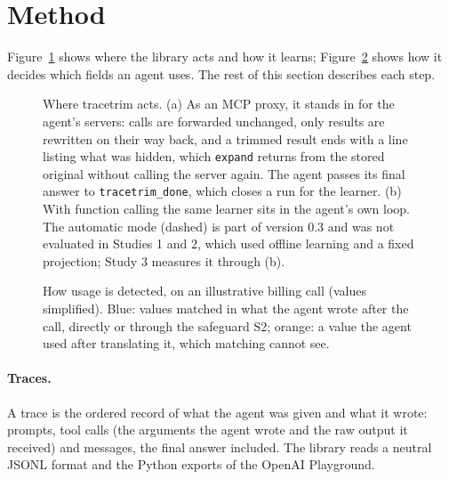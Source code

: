 \section{Method}
\label{sec:method}

Figure~\ref{fig:architecture} shows where the library acts and how it learns; Figure~\ref{fig:usage} shows how
it decides which fields an agent uses. The rest of this section describes each step.

\begin{figure}[t]
\centering

\caption{Where tracetrim acts. (a) As an MCP proxy, it stands in for the agent's servers: calls are forwarded
unchanged, only results are rewritten on their way back, and a trimmed result ends with a line listing what was
hidden, which \texttt{expand} returns from the stored original without calling the server again. The agent passes
its final answer to \texttt{tracetrim\_done}, which closes a run for the learner. (b) With function calling the same
learner sits in the agent's own loop. The automatic mode (dashed) is part of version 0.3 and was not evaluated in
Studies 1 and 2, which used offline learning and a fixed projection; Study 3 measures it through (b).}
\label{fig:architecture}
\end{figure}

\begin{figure}[t]
\centering

\caption{How usage is detected, on an illustrative billing call (values simplified). Blue: values matched in what
the agent wrote after the call, directly or through the safeguard S2; orange: a value the agent used after
translating it, which matching cannot see.}
\label{fig:usage}
\end{figure}

\paragraph{Traces.} A trace is the ordered record of what the agent was given and what it wrote: prompts, tool
calls (the arguments the agent wrote and the raw output it received) and messages, the final answer included. The
library reads a neutral JSONL format and the Python exports of the OpenAI Playground.

